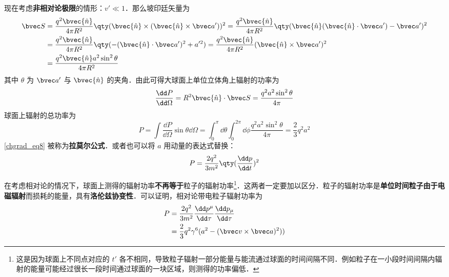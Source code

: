 现在考虑\textbf{非相对论极限}的情形：$v'\ll 1$．那么坡印廷矢量为
\begin{equation}
\begin{aligned}
\bvec S&=\frac{q^2\bvec{\hat n}}{4\pi R^2}\qty(\bvec{\hat n}\times (\bvec{\hat n}\times \bvec a'))^2=\frac{q^2\bvec{\hat n}}{4\pi R^2}\qty(\bvec {\hat n}(\bvec{\hat n}\cdot \bvec a')-\bvec a')^2\\
&=\frac{q^2\bvec{\hat n}}{4\pi R^2}\qty( -(\bvec{\hat n}\cdot \bvec a')^2+a'^2 )=\frac{q^2\bvec{\hat n}}{4\pi R^2}(\bvec{\hat n}\times \bvec a')^2\\
&=\frac{q^2\bvec{\hat n}a^2\sin^2\theta}{4\pi R^2}
\end{aligned}
\end{equation}
其中 $\theta$ 为 $\bvec a'$ 与 $\bvec{\hat n}$ 的夹角．由此可得大球面上单位立体角上辐射的功率为
\begin{equation}
\frac{\dd P}{\dd \Omega}=R^2\bvec{\hat n}\cdot \bvec S=\frac{q^2a^2\sin^2\theta}{4\pi}
\end{equation}
球面上辐射的总功率为
\begin{equation}\label{chgrad_eq8}
P=\int \frac{\dd P}{\dd \Omega} \sin \theta\dd \Omega=\int_0^\pi\dd \theta\int_0^{2\pi} \dd \phi \frac{q^2a^2\sin^2\theta}{4\pi}=\frac{2}{3}q^2a^2
\end{equation}
\autoref{chgrad_eq8} 被称为\textbf{拉莫尔公式}．或者也可以将 $a$ 用动量的表达式替换：
\begin{equation}
P=\frac{2q^2}{3m^2}\qty(\frac{\dd p}{\dd t})^2
\end{equation}

在考虑相对论的情况下，球面上测得的辐射功率\textbf{不再等于}粒子的辐射功率\footnote{这是因为球面上不同点对应的 $t'$ 各不相同，导致粒子辐射一部分能量与能流通过球面的时间间隔不同．例如粒子在一小段时间间隔内辐射的能量可能经过很长一段时间通过球面的一块区域，则测得的功率偏低．}．这两者一定要加以区分．粒子的辐射功率是\textbf{单位时间粒子由于电磁辐射}而损耗的能量，具有\textbf{洛伦兹协变性}．可以证明，相对论带电粒子辐射功率为
\begin{equation}
\begin{aligned}
P&=\frac{2q^2}{3m^2}\frac{\dd p^\mu}{\dd \tau}\frac{\dd p_\mu}{\dd \tau}\\
&=\frac{2}{3}q^2\gamma^6(a^2-(\bvec v\times \bvec a)^2))
\end{aligned}
\end{equation}